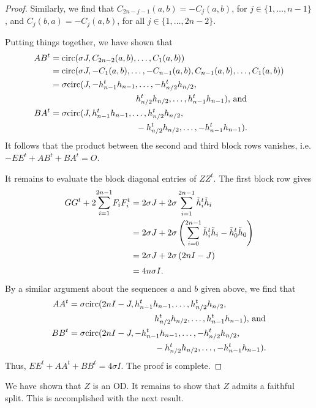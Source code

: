 \documentclass[../../../main]{subfiles}
\begin{document}
\begin{proof}
  Similarly, we find that $C_{2n-j-1}(a,b)=-C_j(a,b)$, for $j \in \{1, \dots, n-1\}$, and $C_j(b,a)=-C_j(a,b)$, for all $j \in \{1, \dots, 2n-2\}$.
  
  Putting things together, we have shown that
  \begin{align*}
   AB^t &= \text{circ}(\sigma J,C_{2n-2}(a,b),\dots,C_1(a,b)) \\
   &= \text{circ}(\sigma J,-C_1(a,b),\dots,-C_{n-1}(a,b),C_{n-1}(a,b),\dots,C_1(a,b)) \\
   &= \sigma\text{circ}(J,-h_{n-1}^th_{n-1}, \dots, -h_{n/2}^th_{n/2},\\ 
   &\qquad\qquad\qquad\qquad\qquad h_{n/2}^th_{n/2},\dots,h_{n-1}^th_{n-1}) \text{, and} \\
   BA^t &= \sigma\text{circ}(J,h_{n-1}^th_{n-1}, \dots, h_{n/2}^th_{n/2},\\ 
   &\qquad\qquad\qquad\qquad\qquad -h_{n/2}^th_{n/2},\dots,-h_{n-1}^th_{n-1}).
  \end{align*}
  It follows that the product between the second and third block rows vanishes, i.e. $-EE^t + AB^t + BA^t = O$.
  
  It remains to evaluate the block diagonal entries of $ZZ^t$. The first block row gives
  \begin{align*}
  GG^t + 2\ssum_{i=1}^{2n-1}F_iF_i^t &= 2\sigma J + 2\sigma\sum_{i=1}^{2n-1}\tilde h_i^t \tilde h_i \\
  &= 2\sigma J + 2\sigma\left(\sum_{i=0}^{2n-1}\tilde h_i^t \tilde h_i - \tilde h_0^t \tilde h_0\right) \\
  &= 2\sigma J + 2\sigma\left( 2nI - J \right) \\
  &= 4n\sigma I.
  \end{align*}
  By a similar argument about the sequences $a$ and $b$ given above, we find that
  \begin{align*}
   AA^t &= \sigma\text{circ}(2nI-J,h_{n-1}^th_{n-1}, \dots, h_{n/2}^th_{n/2},\\ 
   &\qquad\qquad\qquad\qquad\qquad h_{n/2}^th_{n/2},\dots,h_{n-1}^th_{n-1}) \text{, and} \\
   BB^t &= \sigma\text{circ}(2nI-J,-h_{n-1}^th_{n-1}, \dots, -h_{n/2}^th_{n/2},\\ 
   &\qquad\qquad\qquad\qquad\qquad -h_{n/2}^th_{n/2},\dots,-h_{n-1}^th_{n-1}). 
  \end{align*}
  Thus, $EE^t + AA^t + BB^t = 4\sigma I$. The proof is complete.
 \end{proof}
 
 We have shown that $Z$ is an OD. It remains to show that $Z$ admits a faithful split. This is accomplished with the next result.
 
\end{document}
